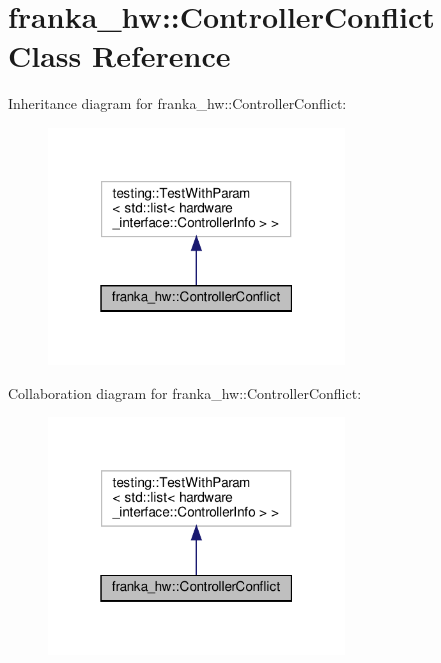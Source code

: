 \hypertarget{classfranka__hw_1_1_controller_conflict}{}\section{franka\+\_\+hw\+:\+:Controller\+Conflict Class Reference}
\label{classfranka__hw_1_1_controller_conflict}


Inheritance diagram for franka\+\_\+hw\+:\+:Controller\+Conflict\+:
\nopagebreak
\begin{figure}[H]
\begin{center}
\leavevmode
\includegraphics[width=223pt]{classfranka__hw_1_1_controller_conflict__inherit__graph}
\end{center}
\end{figure}


Collaboration diagram for franka\+\_\+hw\+:\+:Controller\+Conflict\+:
\nopagebreak
\begin{figure}[H]
\begin{center}
\leavevmode
\includegraphics[width=223pt]{classfranka__hw_1_1_controller_conflict__coll__graph}
\end{center}
\end{figure}
